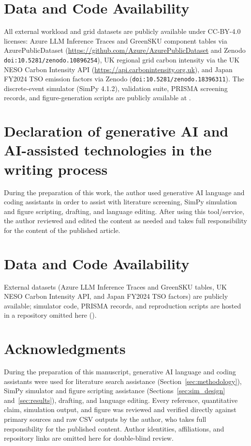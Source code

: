 \ifdefined\BUILDELSEVIER
\section*{Data and Code Availability}
All external workload and grid datasets are publicly available under CC-BY-4.0 licenses: Azure LLM Inference Traces and GreenSKU component tables via AzurePublicDataset (\url{https://github.com/Azure/AzurePublicDataset} and Zenodo \texttt{doi:10.5281/zenodo.10896254}), UK regional grid carbon intensity via the UK NESO Carbon Intensity API (\url{https://api.carbonintensity.org.uk}), and Japan FY2024 TSO emission factors via Zenodo (\texttt{doi:10.5281/zenodo.18396311}). The discrete-event simulator (SimPy 4.1.2), validation suite, PRISMA screening records, and figure-generation scripts are publicly available at \repourl.

\section*{Declaration of generative AI and AI-assisted technologies in the writing process}
During the preparation of this work, the author used generative AI language and coding assistants in order to assist with literature screening, SimPy simulation and figure scripting, drafting, and language editing. After using this tool/service, the author reviewed and edited the content as needed and takes full responsibility for the content of the published article.
\else
\ifdefined\BUILDANON
\section*{Data and Code Availability}
External datasets (Azure LLM Inference Traces and GreenSKU tables, UK NESO Carbon Intensity API, and Japan FY2024 TSO factors) are publicly available; simulator code, PRISMA records, and reproduction scripts are hosted in a repository omitted here (\repourl).

\section*{Acknowledgments}
During the preparation of this manuscript, generative AI language and coding assistants were used for literature search assistance (Section~\ref{sec:methodology}), SimPy simulator and figure scripting assistance (Sections~\ref{sec:sim_design} and~\ref{sec:results}), drafting, and language editing. Every reference, quantitative claim, simulation output, and figure was reviewed and verified directly against primary sources and raw CSV outputs by the author, who takes full responsibility for the published content. Author identities, affiliations, and repository links are omitted here for double-blind review.
\else
